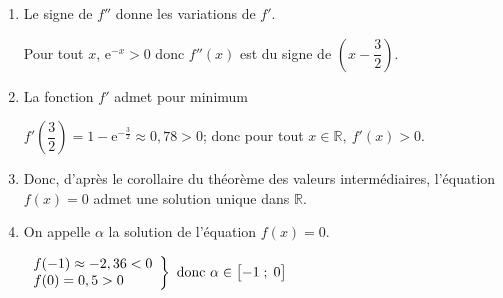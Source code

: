 \documentclass[10pt]{article}
\providecommand{\R}{\mathbb{R}}
\providecommand{\e}{{\mathrm{e}}}
\providecommand{\ds}{\displaystyle}
\begin{document}
\begin{enumerate}
\begin{enumerate}
$f'(x)=1\times \e^{-x} + \left (x+\dfrac{1}{2}\right )\times (-1) \e^{-x} + 1
= \left ( -x +\dfrac{1}{2}\right )\e^{-x}+1$, et donc

$f''(x)= -1\times \e^{-x} + \left (-x+\dfrac{1}{2}\right )\times (-1) \e^{-x}
= \left ( x-\dfrac{3}{2}\right )\e^{-x}$. 

		\item 
Le signe de $f''$ donne les variations de $f'$.

Pour tout $x$, $\e^{-x}>0$ donc $f''(x)$ est du 	signe de $\left (x-\dfrac{3}{2}\right )$.


		\item 
La fonction $f'$ admet pour minimum

$f'\left (\dfrac{3}{2}\right ) =1-\e^{-\frac{3}{2}} \approx 0,78>0$; donc   pour tout $x \in \R,\: f'(x) > 0$.
		
		\item 
{}		

Donc, d'après le corollaire du théorème des valeurs intermédiaires, l'équation $f(x) = 0$ admet une solution unique dans $\R$.
		
		\item 
On appelle $\alpha$ la solution de l'équation $f(x) = 0$.

$\left .
\begin{array}{l}
f(-1)\approx -2,36<0\\
f(0)=0,5>0
\end{array}
\right \}
\text{ donc } \alpha\in \left [-1\;;\;0\strut\right ]$
		

\end{enumerate}
\end{enumerate}
\end{document}
